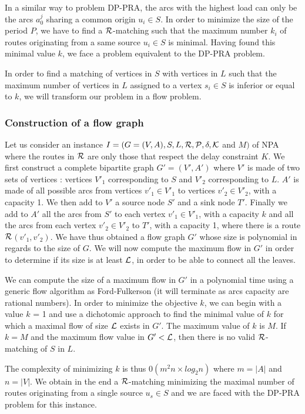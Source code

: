 \documentclass{article}
\newcommand\rmatching{$\cal R$-matching\xspace}
\begin{document}
{In a similar way to problem DP-PRA, the arcs with the highest load can only be the arcs $a_0^j$ sharing a common origin $u_i \in S$. In order to minimize the size of the period $P$, we have to find a \rmatching such that the maximum number $k_i$ of routes originating from a same source $u_i \in S$ is minimal. Having found this minimal value $k$, we face a problem equivalent to the DP-PRA problem.

In order to find a matching of vertices in $S$ with vertices in $L$ such that the maximum number of vertices in $L$ assigned to a vertex $s_i \in S$ is inferior or equal to $k$, we will transform our problem in a flow problem.

\subsubsection{Construction of a flow graph}

Let us consider an instance $I= (G=(V,A), S, L, \cal R, P, \delta, K$ and $M)$ of NPA where the routes in $\cal R$ are only those that respect the delay constraint $K$. We first construct a complete bipartite graph $G'=(V',A')$ where $V'$ is made of two sets of vertices : vertices $V'_1$ corresponding to $S$ and $V'_2$ corresponding to $ L$. $A'$ is made of all possible arcs from vertices $v'_1 \in V'_1$ to vertices $v'_2 \in V'_2$, with a capacity 1. We then add to $V'$ a source node $S'$ and a sink node $T'$. Finally we add to $A'$ all the arcs from $S'$ to each vertex $v'_1 \in V'_1$, with a capacity $k$  and all the arcs from each vertex $v'_2 \in V'_2$ to $T'$, with a capacity 1, where there is a route $\cal R$$(v'_1, v'_2)$. We have thus obtained a flow graph $G'$ whose size is polynomial in regards to the size of $G$. We will now compute the maximum flow in $G'$ in order to determine if its size is at least $\cal L$, in order to be able to connect all the leaves.

We can compute the size of a maximum flow in $G'$ in a polynomial time using a generic flow algorithm as Ford-Fulkerson (it will terminate as arcs capacity are rational numbers). In order to minimize the objective $k$, we can begin with a value $k$ = 1 and use a dichotomic approach to find the minimal value of $k$ for which a maximal flow of size $\cal L$ exists in $G'$. The maximum value of $k$ is $M$. If $k = M$ and the maximum flow value in $G' < \cal L$, then there is no valid \rmatching of $S$ in $L$.

The complexity of minimizing $k$ is thus $0(m^2n \times log_2 n)$ where $m = |A|$ and $n=|V|$. We obtain in the end a \rmatching minimizing the maximal number of routes originating from a single source $u_s \in S$ and we are faced with the DP-PRA problem for this instance.


}
\end{document}
